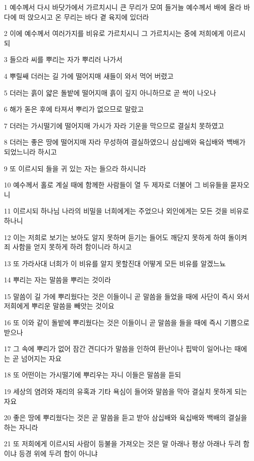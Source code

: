 \par 1 예수께서 다시 바닷가에서 가르치시니 큰 무리가 모여 들거늘 예수께서 배에 올라 바다에 떠 앉으시고 온 무리는 바다 곁 육지에 있더라
\par 2 이에 예수께서 여러가지를 비유로 가르치시니 그 가르치시는 중에 저희에게 이르시되
\par 3 들으라 씨를 뿌리는 자가 뿌리러 나가서
\par 4 뿌릴쌔 더러는 길 가에 떨어지매 새들이 와서 먹어 버렸고
\par 5 더러는 흙이 얇은 돌밭에 떨어지매 흙이 깊지 아니하므로 곧 싹이 나오나
\par 6 해가 돋은 후에 타져서 뿌리가 없으므로 말랐고
\par 7 더러는 가시떨기에 떨어지매 가시가 자라 기운을 막으므로 결실치 못하였고
\par 8 더러는 좋은 땅에 떨어지매 자라 무성하여 결실하였으니 삼십배와 육십배와 백배가 되었느니라 하시고
\par 9 또 이르시되 들을 귀 있는 자는 들으라 하시니라
\par 10 예수께서 홀로 계실 때에 함께한 사람들이 열 두 제자로 더불어 그 비유들을 묻자오니
\par 11 이르시되 하나님 나라의 비밀을 너희에게는 주었으나 외인에게는 모든 것을 비유로 하나니
\par 12 이는 저희로 보기는 보아도 알지 못하며 듣기는 들어도 깨닫지 못하게 하여 돌이켜 죄 사함을 얻지 못하게 하려 함이니라 하시고
\par 13 또 가라사대 너희가 이 비유를 알지 못할진대 어떻게 모든 비유를 알겠느뇨
\par 14 뿌리는 자는 말씀을 뿌리는 것이라
\par 15 말씀이 길 가에 뿌리웠다는 것은 이들이니 곧 말씀을 들었을 때에 사단이 즉시 와서 저희에게 뿌리운 말씀을 빼앗는 것이요
\par 16 또 이와 같이 돌밭에 뿌리웠다는 것은 이들이니 곧 말씀을 들을 때에 즉시 기쁨으로 받으나
\par 17 그 속에 뿌리가 없어 잠간 견디다가 말씀을 인하여 환난이나 핍박이 일어나는 때에는 곧 넘어지는 자요
\par 18 또 어떤이는 가시떨기에 뿌리우는 자니 이들은 말씀을 듣되
\par 19 세상의 염려와 재리의 유혹과 기타 욕심이 들어와 말씀을 막아 결실치 못하게 되는 자요
\par 20 좋은 땅에 뿌리웠다는 것은 곧 말씀을 듣고 받아 삼십배와 육십배와 백배의 결실을 하는 자니라
\par 21 또 저희에게 이르시되 사람이 등불을 가져오는 것은 말 아래나 평상 아래나 두려 함이냐 등경 위에 두려 함이 아니냐
